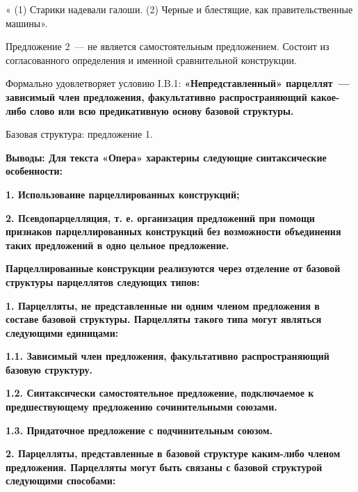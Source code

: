 \documentclass{kursa4}
\begin{document}
    {\color[rgb]{0.2,0.2,0.2}
    « (1) Старики надевали галоши. (2) Черные и блестящие, как
    правительственные машины».}

    {\color[rgb]{0.2,0.2,0.2}
    Предложение 2~--- не является самостоятельным предложением. Состоит из
    согласованного определения и именной сравнительной конструкции.}

    {\color[rgb]{0.2,0.2,0.2}
    Формально удовлетворяет условию I.B.1:
    \textbf{«}\textbf{Непредставленный» парцеллят~--- зависимый член
    предложения, факультативно распространяющий какое-либо слово или всю
    предикативную основу базовой структуры.}}

    {\color[rgb]{0.2,0.2,0.2}
    Базовая структура: предложение 1. }

    {\bfseries\color[rgb]{0.2,0.2,0.2}
    Выводы: \textmd{Для текста «Опера» характерны следующие
    синтаксические особенности:}}

    {\bfseries\color[rgb]{0.2,0.2,0.2}
    \textmd{1. Использование парцеллированных конструкций;}}

    {\bfseries\color[rgb]{0.2,0.2,0.2}
    \textmd{2. Псевдопарцелляция, т. е. организация предложений при
    помощи признаков парцеллированных конструкций }\textmd{без возможности
    объединения таких предложений в одно цельное предложение.}}

    {\bfseries\color[rgb]{0.2,0.2,0.2}
    \textmd{}Парцеллированные конструкции\textmd{ }\textmd{реализуются
    через отделение от базовой структуры парцеллятов следующих
    типов}\textmd{:}}

    {\bfseries\color[rgb]{0.2,0.2,0.2}
    \textmd{}\textmd{1. Парцелляты, не представленные ни одним членом
    предложения в составе базовой структуры. Парцелляты такого типа могут
    являться следующими единицами:}}

    {\bfseries\color[rgb]{0.2,0.2,0.2}
    \textmd{1.1. Зависимый член предложения, факультативно
    распространяющий базовую структуру.}}

    {\bfseries\color[rgb]{0.2,0.2,0.2}
    \textmd{1.2. }\textmd{Синтаксически самостоятельное предложение,
    подключаемое к предшествующему предложению сочинительными союзами.}}

    {\bfseries\color[rgb]{0.2,0.2,0.2}
    \textmd{1.3. Придаточное предложение с подчинительным союзом.}}

    {\bfseries\color[rgb]{0.2,0.2,0.2}
    \textmd{2. Парцелляты, представленные в базовой структуре каким-либо
    членом предложения. Парцелляты могут быть связаны с базовой структурой
    следующими способами:}}
\end{document}
